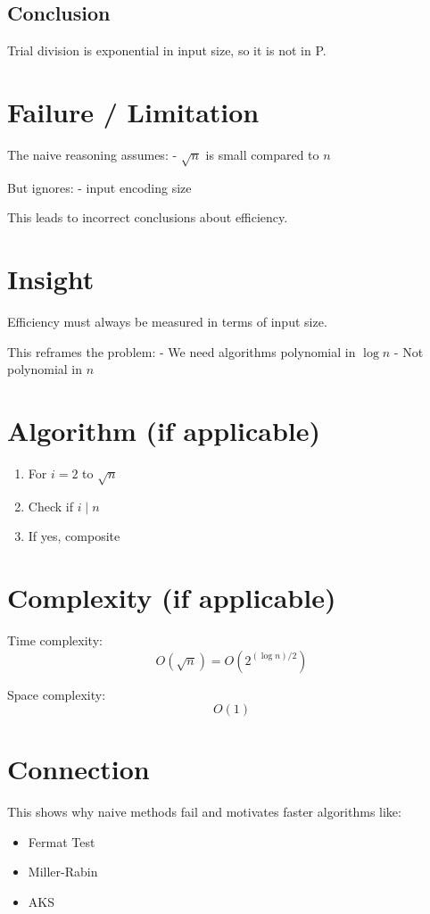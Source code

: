 \documentclass{article}
\begin{document}
\subsection*{Conclusion}

Trial division is exponential in input size, so it is not in P.

\section{Failure / Limitation}

The naive reasoning assumes:
- $\sqrt{n}$ is small compared to $n$

But ignores:
- input encoding size

This leads to incorrect conclusions about efficiency.

\section{Insight}

Efficiency must always be measured in terms of input size.

This reframes the problem:
- We need algorithms polynomial in $\log n$
- Not polynomial in $n$

\section{Algorithm (if applicable)}

\begin{enumerate}
    \item For $i = 2$ to $\sqrt{n}$
    \item Check if $i \mid n$
    \item If yes, composite
\end{enumerate}

\section{Complexity (if applicable)}

Time complexity:
\[
    O(\sqrt{n}) = O(2^{(\log n)/2})
\]

Space complexity:
\[
    O(1)
\]

\section{Connection}

This shows why naive methods fail and motivates faster algorithms like:
\begin{itemize}
    \item Fermat Test
    \item Miller-Rabin
    \item AKS
\end{itemize}
\end{document}
